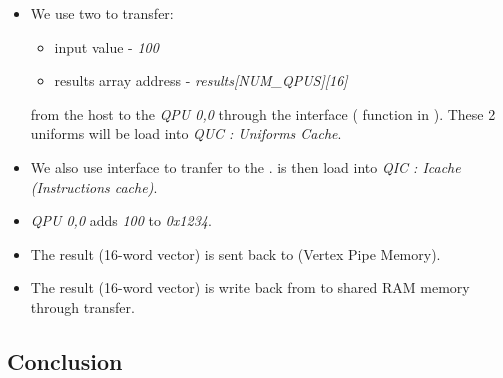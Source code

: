 \begin{itemize}
	\item We use two  to transfer:
		\begin{itemize}
			\item input value - \emph{100}
			\item results array address - \emph{results[NUM\_QPUS][16]}
		\end{itemize}
		from the host \cpu{} to the \emph{QPU 0,0} through the  interface ( function in ). These 2 uniforms will be load into \emph{QUC : Uniforms Cache}.
	\item We also use  interface to tranfer  to the .  is then load into \emph{QIC : Icache (Instructions cache)}.
	\item \emph{QPU 0,0} adds \emph{100} to \emph{0x1234}.
	\item The result (16-word vector) is sent back to  (Vertex Pipe Memory).
	\item The result (16-word vector) is write back from  to shared RAM memory through  transfer.
\end{itemize}


\subsection{Conclusion}

